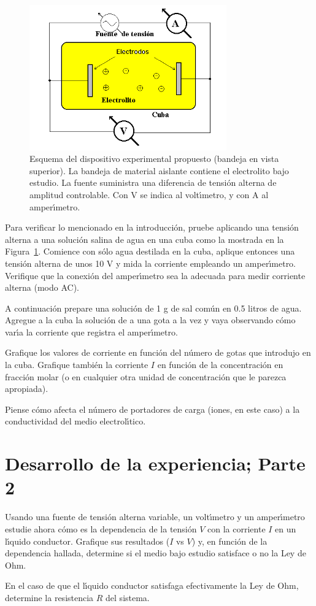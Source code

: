 \documentclass[laboratorio]{guia}
\begin{document}
\begin{figure}
    \centering
\includegraphics[width=8.5cm]{LG02b--001.png}
\caption{Esquema del dispositivo experimental propuesto (bandeja en vista
superior). La bandeja de material aislante contiene el electrolito bajo
estudio. La fuente suministra una diferencia de tensi\'on alterna de amplitud
controlable. Con V se indica al volt\'\i metro, y con A al amper\'\i metro.}
\label{fig:1}
\end{figure}

Para verificar lo mencionado en la introducci\'on, pruebe aplicando una
tensi\'on alterna a una soluci\'on salina de agua en una cuba como la mostrada
en la Figura~\ref{fig:1}. Comience con s\'olo agua destilada en la cuba,
aplique entonces una tensi\'on alterna de unos 10 V y mida la corriente
empleando un amper\'\i metro. Verifique que la conexi\'on del amper\'\i metro
sea la adecuada para medir corriente alterna (modo AC). 

A continuaci\'on prepare una soluci\'on de 1 g de sal com\'un en 0.5 litros de
agua. Agregue a la cuba la soluci\'on de a una gota a la vez y vaya observando
c\'omo var\'\i a la corriente que registra el amper\'\i metro. 

Grafique los valores de corriente en funci\'on del n\'umero de gotas que
introdujo en la cuba. Grafique tambi\'en la corriente $I$ en funci\'on de la
concentraci\'on en fracci\'on molar (o en cualquier otra unidad de
concentraci\'on que le parezca apropiada). 

Piense c\'omo afecta el n\'umero de portadores de carga (iones, en este caso) a
la conductividad del medio electrol\'\i tico. 


\section{Desarrollo de la experiencia; Parte 2}

Usando una fuente de tensi\'on alterna variable, un volt\'\i metro y un
amper\'\i metro estudie ahora c\'omo es la dependencia de la tensi\'on $V$ con
la corriente $I$ en un l\'\i quido conductor. Grafique sus resultados ($I$ vs
$V$) y, en funci\'on de la dependencia hallada, determine si el medio bajo
estudio satisface o no la Ley de Ohm. 

En el caso de que el l\'\i quido conductor satisfaga efectivamente la Ley de
Ohm, determine la resistencia $R$ del sistema.




\nocite{Alonso1998,Purcell1988,Reitz1996}
 

\end{document}
